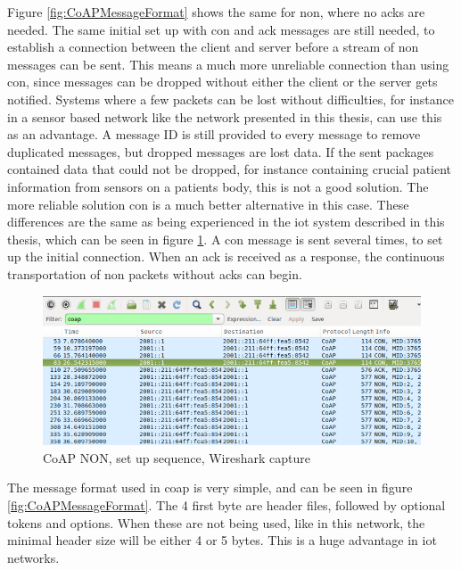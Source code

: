 \noindent Figure \ref{fig:CoAPMessageFormat} shows the same for \gls{non}, where no \glspl{ack} are needed. The same initial set up with \gls{con} and \gls{ack} messages are still needed, to establish a connection between the client and server before a stream of \gls{non} messages can be sent. This means a much more unreliable connection than using \gls{con}, since messages can be dropped without either the client or the server gets notified. Systems where a few packets can be lost without difficulties, for instance in a sensor based network like the network presented in this thesis, can use this as an advantage. A message ID is still provided to every message to remove duplicated messages, but dropped messages are lost data. If the sent packages contained data that could not be dropped, for instance containing crucial patient information from sensors on a patients body, this is not a good solution. The more reliable solution \gls{con} is a much better alternative in this case. These differences are the same as being experienced in the \gls{iot} system described in this thesis, which can be seen in figure \ref{fig:CoAPNONwiresharkSetUp}. A \gls{con} message is sent several times, to set up the initial connection. When an \gls{ack} is received as a response, the continuous transportation of \gls{non} packets without \glspl{ack} can begin. %

\begin{figure}[ht]
    \centering
    \includegraphics[width=1.0\textwidth]{coapCONwiresharksetUpSequence.png}    
    \caption{CoAP NON, set up sequence, Wireshark capture}
    \label{fig:CoAPNONwiresharkSetUp}
\end{figure}


\noindent The message format used in \gls{coap} is very simple, and can be seen in figure \ref{fig:CoAPMessageFormat}. The 4 first byte are header files, followed by optional tokens and options. When these are not being used, like in this network, the minimal header size will be either 4 or 5 bytes. This is a huge advantage in \gls{iot} networks.

